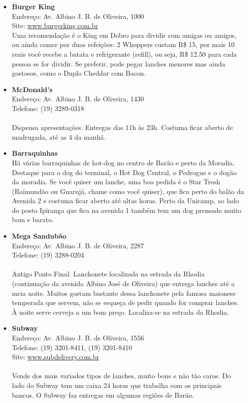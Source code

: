 \begin{itemize}
\item \textbf{Burger King}
  \\Endereço: Av. Albino J. B. de Oliveira, 1000
  \\Site: \url{www.burgerking.com.br}
  \\Uma recomendação é o King em Dobro para dividir com amigas ou amigos, ou
  ainda comer por duas refeições: 2 Whoppers custam R\$ 15, por mais 10 reais
  você recebe a batata e refrigerante (refill), ou seja, R\$ 12,50 para cada
  pessoa se for dividir. Se preferir, pode pegar lanches menores mas ainda
  gostosos, como o Duplo Cheddar com Bacon.

\item \textbf{McDonald's}
  \\Endereço: Av. Albino J. B. de Oliveira, 1430
  \\Telefone: (19) 3289-0318
  \\
  \\Dispensa apresentações. Entregas das 11h às 23h. Costuma ficar aberto
  de madrugada, até as 4 da manhã.

\item \textbf{Barraquinhas}
  \\Há várias barraquinhas de hot-dog no centro de Barão e perto da Moradia.
  Destaque para o dog do terminal, o Hot Dog Central, o Pedrogue e o dogão da
  moradia. Se você quiser um lanche, uma boa pedida é o Star Tresh (Raimundão
  ou Guarujá, chame como você quiser), que fica perto do balão da Avenida 2 e
  costuma ficar aberto até altas horas. Perto da Unicamp, ao lado do posto
  Ipiranga que fica na avenida 1 também tem um dog prensado muito bom e barato.

\item \textbf{Mega Sandubão}
  \\Endereço: Av. Albino J. B. de Oliveira, 2287
  \\Telefone: (19) 3288-0204
  \\
  \\Antigo Ponto Final. Lanchonete localizada na estrada da Rhodia
  (continuação da avenida Albino José de Oliveira) que entrega lanches até
  a meia noite. Muitos gostam bastante dessa lanchonete pela famosa maionese
  temperada que servem, não se esqueça de pedir quando for comprar lanches. À
  noite serve cerveja a um bom preço. Localiza-se na estrada da Rhodia.

\item \textbf{Subway}
  \\Endereço: Av. Albino J. B. de Oliveira, 1556
  \\Telefone: (19) 3201-8411, (19) 3201-8410
  \\Site: \url{www.subdelivery.com.br}
  \\
  \\Vende dos mais variados tipos de lanches, muito bons e não tão caros. Do
  lado do Subway tem um caixa 24 horas que trabalha com os principais bancos.
  O Subway faz entregas em algumas regiões de Barão.
\end{itemize}

